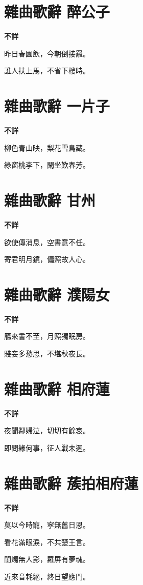 \documentclass[12pt,a4paper]{ctexbook}
\begin{document}
\section{雜曲歌辭 醉公子}
\textbf{不詳}\par\vspace{0.5em}
昨日春園飲，今朝倒接䍦。\par
誰人扶上馬，不省下樓時。\par

\section{雜曲歌辭 一片子}
\textbf{不詳}\par\vspace{0.5em}
柳色青山映，梨花雪鳥藏。\par
綠窗桃李下，閑坐歎春芳。\par

\section{雜曲歌辭 甘州}
\textbf{不詳}\par\vspace{0.5em}
欲使傳消息，空書意不任。\par
寄君明月鏡，偏照故人心。\par

\section{雜曲歌辭 濮陽女}
\textbf{不詳}\par\vspace{0.5em}
鴈來書不至，月照獨眠房。\par
賤妾多愁思，不堪秋夜長。\par

\section{雜曲歌辭 相府蓮}
\textbf{不詳}\par\vspace{0.5em}
夜聞鄰婦泣，切切有餘哀。\par
即問緣何事，征人戰未迴。\par

\section{雜曲歌辭 蔟拍相府蓮}
\textbf{不詳}\par\vspace{0.5em}
莫以今時寵，寧無舊日恩。\par
看花滿眼淚，不共楚王言。\par
閨燭無人影，羅屏有夢魂。\par
近來音耗絕，終日望應門。\par
\end{document}
